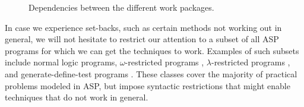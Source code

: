 \documentclass[a4paper,11pt]{article}
\begin{document}
\begin{wrapfigure}{r}{0.5\textwidth}
{\begin{tikzpicture}
\end{tikzpicture}
}
\caption{Dependencies between the different work packages.}
\label{fig:dependencies} 
\end{wrapfigure}

In case we experience set-backs, such as certain methods not working out in general, we will not hesitate to restrict our attention to a subset of all ASP programs for which we can get the techniques to work. 
Examples of such subsets include normal logic programs, $\omega$-restricted programs \cite{lpnmr/Syrjanen01}, $\lambda$-restricted programs \cite{lpnmr/GebserST07}, 
and generate-define-test programs \cite{Lifschitz/AI02}. 
These classes cover the majority of practical problems modeled in ASP, but impose syntactic restrictions that might enable techniques that do not work in general. 





\end{document}
